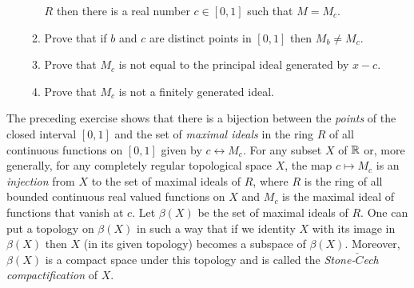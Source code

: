 \begin{enumerate}
\begin{enumerate}
                           $R$ then there is a real number $c \in [0, 1]$ such
                           that $M = M_c$.
                     \item Prove that if $b$ and $c$ are distinct points in
                           $[0, 1]$ then $M_b \neq M_c$.
                     \item Prove that $M_c$ is not equal to the principal ideal
                           generated by $x - c$.
                     \item Prove that $M_c$ is not a finitely generated ideal.
                  \end{enumerate}
\end{enumerate}

\noindent The preceding exercise shows that there is a bijection between the
\textit{points} of the closed interval $[0, 1]$ and the set of
\textit{maximal ideals} in the ring $R$ of all continuous functions on $[0, 1]$
given by $c \leftrightarrow M_c$. For any subset $X$ of $\mathbb{R}$ or, more generally,
for any completely regular topological space $X$, the map $c \mapsto M_c$ is an
\textit{injection} from $X$ to the set of maximal ideals of $R$, where $R$ is
the ring of all bounded continuous real valued functions on $X$ and $M_c$ is the 
maximal ideal of functions that vanish at $c$. Let $\beta(X)$ be the set of
maximal ideals of $R$. One can put a topology on $\beta(X)$ in such a way that
if we identity $X$ with its image in $\beta(X)$ then $X$ (in its given topology)
becomes a subspace of $\beta(X)$. Moreover, $\beta(X)$ is a compact space under
this topology and is called the \textit{Stone-$\check{C}$ech compactification}
of $X$.

